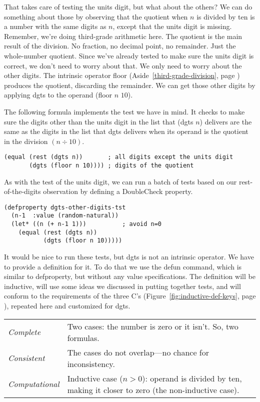 That takes care of testing the units digit, but what about the others?
We can do something about those by observing that the quotient
when $n$ is divided by ten
is a number with the same digits as $n$,
except that the units digit is missing.
Remember, we're doing third-grade arithmetic here.
The quotient is the main result of the division.
No fraction, no decimal point, no remainder. Just the whole-number quotient.
Since we've already tested to make sure the units digit is correct,
we don't need to worry about that.
We only need to worry about the other digits.
The intrinsic operator \textsf{floor}
(Aside~\ref{third-grade-division}, page \pageref{third-grade-division})
produces the quotient, discarding the remainder.
We can get those other digits by applying \textsf{dgts} to
the operand \textsf{(floor $n$ $10$)}.

The following formula implements the test we have in mind.
It checks to make sure the digits other than the units digit
in the list that \textsf{(dgts $n$)} delivers
are the same as the digits in the list that
\textsf{dgts} delivers when its operand is the quotient in
the division $(n \div 10)$.
\begin{Verbatim}
(equal (rest (dgts n))       ; all digits except the units digit
       (dgts (floor n 10)))) ; digits of the quotient
\end{Verbatim}

As with the test of the units digit,
we can run a batch of tests based on our rest-of-the-digits
observation by defining a DoubleCheck property.
\begin{Verbatim}
(defproperty dgts-other-digits-tst
  (n-1  :value (random-natural))
  (let* ((n (+ n-1 1)))          ; avoid n=0
    (equal (rest (dgts n))
           (dgts (floor n 10)))))
\end{Verbatim}

It would be nice to run these tests, but \textsf{dgts} is not an intrinsic operator.
We have to provide a definition for it.
To do that we use the \textsf{defun} command, which is similar to \textsf{defproperty},
but without any value specifications. The definition will be inductive, will
use some ideas we discussed in putting together tests,
and will conform to the requirements of the three C's
(Figure~\ref{fig:inductive-def-keys}, page \pageref{fig:inductive-def-keys}),
repeated here and customized for \textsf{dgts}.
\begin{samepage}
\begin{center}
\begin{tabular}{lp{3.5in}}
\emph{Complete}      & Two cases: the number is zero or it isn't. So, two formulas.\\
\emph{Consistent}    & The cases do not overlap---no chance for inconsistency.\\
\emph{Computational} & Inductive case ($n > 0$): operand is
                       divided by ten, making it closer to zero
                       (the non-inductive case).
\end{tabular}
\end{center}
\end{samepage}

